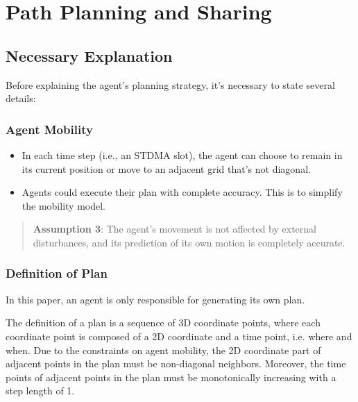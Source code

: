 \section{Path Planning and Sharing}


\subsection{Necessary Explanation}

Before explaining the agent's planning strategy, it's necessary to state several details:

\subsubsection{Agent Mobility}

\begin{itemize}
    \item In each time step (i.e., an STDMA slot), the agent can choose to remain in its current position or move to an adjacent grid that's not diagonal.
    \item Agents could execute their plan with complete accuracy. This is to simplify the mobility model.
\end{itemize}

\begin{quotation}
    \textbf{Assumption 3}: 
    The agent's movement is not affected by external disturbances, and its prediction of its own motion is completely accurate.
\end{quotation}

\subsubsection{Definition of Plan}
In this paper, an agent is only responsible for generating its own plan.

The definition of a plan is a sequence of 3D coordinate points, where each coordinate point is composed of a 2D coordinate and a time point, i.e. where and when.
Due to the constraints on agent mobility, the 2D coordinate part of adjacent points in the plan must be non-diagonal neighbors. Moreover, the time points of adjacent points in the plan must be monotonically increasing with a step length of 1.

